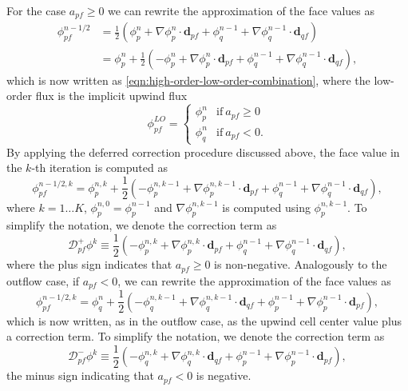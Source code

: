 \documentclass[../thesis.tex]{subfiles}
\begin{document}
For the case \(a_{pf} \geq 0\) we can rewrite the approximation of the face values as
\begin{equation}
	\begin{split}
		\phi_{pf}^{n-1/2}
		&= \frac{1}{2}(\phi_p^n + \nabla\phi_p^n\cdot\mathbf{d}_{pf} +
		\phi_q^{n-1} + \nabla\phi_q^{n-1}\cdot\mathbf{d}_{qf}) \\
		&= \phi_p^n + \frac{1}{2}(-\phi_p^n + \nabla\phi_p^n\cdot\mathbf{d}_{pf} +
		\phi_q^{n-1} + \nabla\phi_q^{n-1}\cdot\mathbf{d}_{qf}),
	\end{split}
\end{equation}
which is now written as \eqref{eqn:high-order-low-order-combination}, where the low-order
flux is the implicit upwind flux
\begin{equation}\label{eqn:faceval-implicit-upwind}
	\phi_{pf}^{LO} =
	\begin{cases}
		\phi_p^n
		& \text{if}\ a_{pf} \geq 0 \\
		\phi_q^{n}
		& \text{if}\ a_{pf} < 0.
	\end{cases}
\end{equation}
By applying the deferred correction procedure
discussed above, the face value in the \(k\)-th iteration is computed as
\begin{equation}\label{eqn:fval-iteration-outflow}
	\phi_{pf}^{n-1/2,k} = \phi_p^{n,k} +
	\frac{1}{2}(-\phi_p^{n,k-1} + \nabla\phi_p^{n,k-1}\cdot\mathbf{d}_{pf} +
	\phi_q^{n-1} + \nabla\phi_q^{n-1}\cdot\mathbf{d}_{qf}),
\end{equation}
where \(k = 1 \dots K\), \(\phi_p^{n,0} = \phi_p^{n-1}\) and
\(\nabla\phi_p^{n,k-1}\) is computed using \(\phi_p^{n,k-1}\).
To simplify the notation, we denote the correction term as
\begin{equation}\label{eqn:correction-term-outflow}
	\mathcal{D}^+_{pf}\phi^{k}
	\equiv
	\frac{1}{2}(-\phi_p^{n,k} + \nabla\phi_p^{n,k}\cdot\mathbf{d}_{pf} +
	\phi_q^{n-1} + \nabla\phi_q^{n-1}\cdot\mathbf{d}_{qf}),
\end{equation}
where the plus sign indicates that \(a_{pf} \geq 0 \) is non-negative.
Analogously to the outflow case, if \(a_{pf} < 0\), we can rewrite the
approximation of the face values as
\begin{equation}\label{eqn:fval-iteration-inflow}
	\phi_{pf}^{n-1/2,k}
	= \phi_q^{n} + \frac{1}{2}(-\phi_q^{n,k-1} + \nabla\phi_q^{n,k-1}\cdot\mathbf{d}_{qf} +
	\phi_p^{n-1} + \nabla\phi_p^{n-1}\cdot\mathbf{d}_{pf}),
\end{equation}
which is now written, as in the outflow case,
as the upwind cell center value plus a correction term.
To simplify the notation, we denote the correction term as
\begin{equation}\label{eqn:correction-term-inflow}
	\mathcal{D}_{pf}^-\phi^k
	\equiv
	\frac{1}{2}(-\phi_q^{n,k} + \nabla\phi_q^{n,k}\cdot\mathbf{d}_{qf} +
	\phi_p^{n-1} + \nabla\phi_p^{n-1}\cdot\mathbf{d}_{pf}),
\end{equation}
the minus sign indicating that \(a_{pf} < 0\) is negative.
\end{document}
